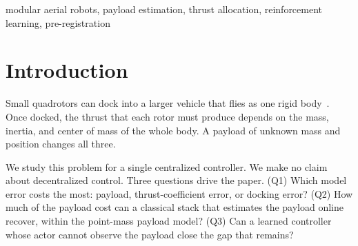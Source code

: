 \documentclass[conference]{IEEEtran}
\begin{document}
\begin{IEEEkeywords}
modular aerial robots, payload estimation, thrust allocation, reinforcement learning, pre-registration
\end{IEEEkeywords}

\section{Introduction}
Small quadrotors can dock into a larger vehicle that flies as one rigid body~\cite{saldana2018modquad,xu2025modular,mu2020universal}.
Once docked, the thrust that each rotor must produce depends on the mass, inertia, and center of mass of the whole body.
A payload of unknown mass and position changes all three.

We study this problem for a single centralized controller.
We make no claim about decentralized control.
Three questions drive the paper.
(Q1) Which model error costs the most: payload, thrust-coefficient error, or docking error?
(Q2) How much of the payload cost can a classical stack that estimates the payload online recover, within the point-mass payload model?
(Q3) Can a learned controller whose actor cannot observe the payload close the gap that remains?
\end{document}
